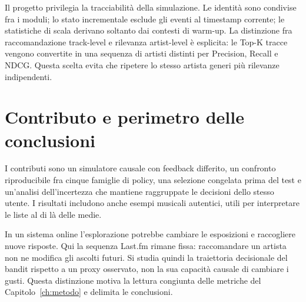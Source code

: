 Il progetto privilegia la tracciabilità della simulazione. Le identità sono condivise fra i moduli; lo stato incrementale esclude gli eventi al timestamp corrente; le statistiche di scala derivano soltanto dai contesti di warm-up. La distinzione fra raccomandazione track-level e rilevanza artist-level è esplicita: le Top-K tracce vengono convertite in una sequenza di artisti distinti per Precision, Recall e NDCG. Questa scelta evita che ripetere lo stesso artista generi più rilevanze indipendenti.

\section{Contributo e perimetro delle conclusioni}
I contributi sono un simulatore causale con feedback differito, un confronto riproducibile fra cinque famiglie di policy, una selezione congelata prima del test e un'analisi dell'incertezza che mantiene raggruppate le decisioni dello stesso utente. I risultati includono anche esempi musicali autentici, utili per interpretare le liste al di là delle medie.

In un sistema online l'esplorazione potrebbe cambiare le esposizioni e raccogliere nuove risposte. Qui la sequenza Last.fm rimane fissa: raccomandare un artista non ne modifica gli ascolti futuri. Si studia quindi la traiettoria decisionale del bandit rispetto a un proxy osservato, non la sua capacità causale di cambiare i gusti. Questa distinzione motiva la lettura congiunta delle metriche del Capitolo~\ref{ch:metodo} e delimita le conclusioni.
